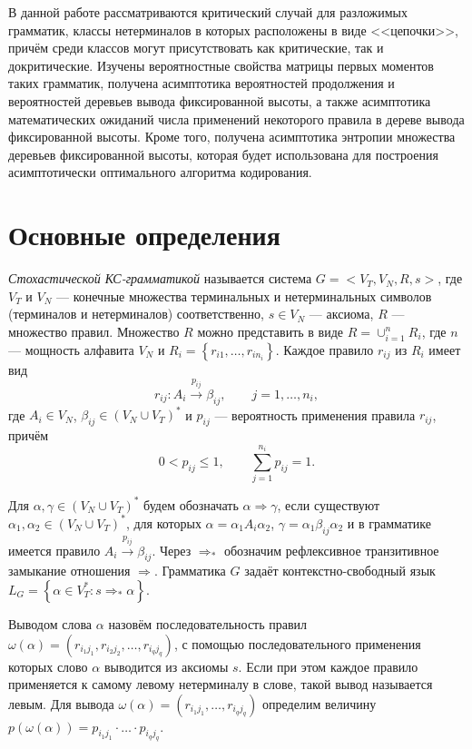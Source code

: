 \documentclass[12pt]{article}
\renewcommand{\leq}{\leqslant}
\begin{document}
В данной работе рассматриваются критический случай для разложимых грамматик, классы нетерминалов в которых расположены в виде <<цепочки>>, причём среди классов могут присутствовать как критические, так и докритические. Изучены вероятностные свойства матрицы первых моментов таких грамматик, получена асимптотика вероятностей продолжения и вероятностей деревьев вывода фиксированной высоты, а также асимптотика математических ожиданий числа применений некоторого правила в дереве вывода фиксированной высоты. Кроме того, получена асимптотика энтропии множества деревьев фиксированной высоты, которая будет использована для построения асимптотически оптимального алгоритма кодирования.

\section{Основные определения}

\textit{Стохастической КС-грамматикой} \cite{fu-struct} называется система $G = <V_T, V_N, R, s>$, где $V_T$ и $V_N$ --- конечные множества терминальных и нетерминальных символов (терминалов и нетерминалов) соответственно, $s \in V_N$ --- аксиома, $R$ --- множество правил. Множество $R$ можно представить в виде $R = \cup_{i = 1}^n R_i$, где $n$ --- мощность алфавита $V_N$ и $R_i = \left\{r_{i1}, \ldots, r_{i n_i}\right\}$. Каждое правило $r_{ij}$ из $R_i$ имеет вид
\begin{equation}
	r_{ij} : A_i \xrightarrow{p_{ij}} \beta_{ij},\qquad j = 1, \ldots, n_i,
\end{equation}
где $A_i \in V_N$, $\beta_{ij} \in (V_N \cup V_T)^*$ и $p_{ij}$ --- вероятность применения правила $r_{ij}$, причём
\begin{equation}
\label{eq:p_values}
	0 < p_{ij} \leq 1,\qquad \sum_{j = 1}^{n_i} p_{ij} = 1.
\end{equation}

Для $\alpha, \gamma \in (V_N \cup V_T)^*$ будем обозначать $\alpha \Rightarrow \gamma$, если существуют $\alpha_1, \alpha_2 \in (V_N \cup V_T)^*$, для которых $\alpha = \alpha_1 A_i \alpha_2$, $\gamma = \alpha_1 \beta_{ij} \alpha_2$ и в грамматике имеется правило $A_i \xrightarrow{p_{ij}} \beta_{ij}$. Через $\Rightarrow_*$ обозначим рефлексивное транзитивное замыкание отношения $\Rightarrow$. Грамматика $G$ задаёт контекстно-свободный язык $L_G = \left\{ \alpha \in V_T^* : s \Rightarrow_* \alpha\right\}$.

Выводом слова $\alpha$ назовём последовательность правил $\omega(\alpha) = (r_{i_1 j_1}, r_{i_2 j_2}, \ldots, r_{i_q j_q})$, с помощью последовательного применения которых слово $\alpha$ выводится из аксиомы $s$. Если при этом каждое правило применяется к самому левому нетерминалу в слове, такой вывод называется левым. Для вывода $\omega(\alpha) = (r_{i_1 j_1}, \ldots, r_{i_q j_q})$ определим величину $p(\omega(\alpha)) = p_{i_1 j_1} \cdot \ldots \cdot p_{i_q j_q}$.
\end{document}
